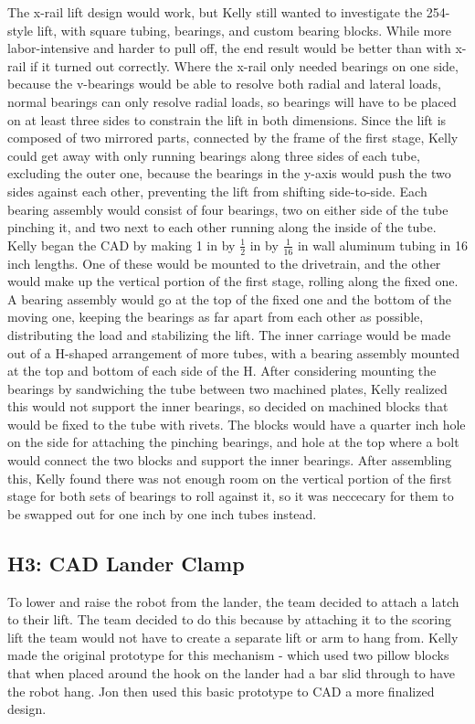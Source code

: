 \documentclass{article}
\begin{document}
The x-rail lift design would work, but Kelly still wanted to investigate the 254-style lift, with square tubing, bearings, and custom bearing blocks. While more labor-intensive and harder to pull off, the end result would be better than with x-rail if it turned out correctly. Where the x-rail only needed bearings on one side, because the v-bearings would be able to resolve both radial and lateral loads, normal bearings can only resolve radial loads, so bearings will have to be placed on at least three sides to constrain the lift in both dimensions. Since the lift is composed of two mirrored parts, connected by the frame of the first stage, Kelly could get away with only running bearings along three sides of each tube, excluding the outer one, because the bearings in the y-axis would push the two sides against each other, preventing the lift from shifting side-to-side. Each bearing assembly would consist of four bearings, two on either side of the tube pinching it, and two next to each other running along the inside of the tube. Kelly began the CAD by making 1 in by $\frac{1}{2}$ in by $\frac{1}{16}$ in wall aluminum tubing in 16 inch lengths. One of these would be mounted to the drivetrain, and the other would make up the vertical portion of the first stage, rolling along the fixed one. A bearing assembly would go at the top of the fixed one and the bottom of the moving one, keeping the bearings as far apart from each other as possible, distributing the load and stabilizing the lift. The inner carriage would be made out of a H-shaped arrangement of more tubes, with a bearing assembly mounted at the top and bottom of each side of the H. After considering mounting the bearings by sandwiching the tube between two machined plates, Kelly realized this would not support the inner bearings, so decided on machined blocks that would be fixed to the tube with rivets. The blocks would have a quarter inch hole on the side for attaching the pinching bearings, and hole at the top where a bolt would connect the two blocks and support the inner bearings. After assembling this, Kelly found there was not enough room on the vertical portion of the first stage for both sets of bearings to roll against it, so it was neccecary for them to be swapped out for one inch by one inch tubes instead. 

\subsection{H3: CAD Lander Clamp}

To lower and raise the robot from the lander, the team decided to attach a latch to their lift. The team decided to do this because by attaching it to the scoring lift the team would not have to create a separate lift or arm to hang from. Kelly made the original prototype for this mechanism - which used two pillow blocks that when placed around the hook on the lander had a bar slid through to have the robot hang. Jon then used this basic prototype to CAD a more finalized design.
\end{document}
